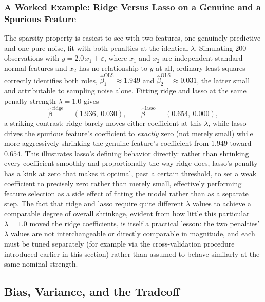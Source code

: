 \documentclass[../ai_in_finance]{subfiles}
\begin{document}
\subsubsection*{A Worked Example: Ridge Versus Lasso on a Genuine and a Spurious Feature}

The sparsity property is easiest to see with two features, one genuinely predictive and one pure noise, fit with both penalties at the identical $\lambda$. Simulating $200$ observations with $y = 2.0\,x_1 + \varepsilon$, where $x_1$ and $x_2$ are independent standard-normal features and $x_2$ has no relationship to $y$ at all, ordinary least squares correctly identifies both roles, $\hat\beta_1^{\text{OLS}} \approx 1.949$ and $\hat\beta_2^{\text{OLS}} \approx 0.031$, the latter small and attributable to sampling noise alone. Fitting ridge and lasso at the same penalty strength $\lambda=1.0$ gives
\begin{equation*}
\hat\beta^{\text{ridge}} = (1.936,\ 0.030), \qquad \hat\beta^{\text{lasso}} = (0.654,\ 0.000),
\end{equation*}
a striking contrast: ridge barely moves either coefficient at this $\lambda$, while lasso drives the spurious feature's coefficient to \emph{exactly} zero (not merely small) while more aggressively shrinking the genuine feature's coefficient from $1.949$ toward $0.654$. This illustrates lasso's defining behavior directly: rather than shrinking every coefficient smoothly and proportionally the way ridge does, lasso's penalty has a kink at zero that makes it optimal, past a certain threshold, to set a weak coefficient to precisely zero rather than merely small, effectively performing feature selection as a side effect of fitting the model rather than as a separate step. The fact that ridge and lasso require quite different $\lambda$ values to achieve a comparable degree of overall shrinkage, evident from how little this particular $\lambda=1.0$ moved the ridge coefficients, is itself a practical lesson: the two penalties' $\lambda$ values are not interchangeable or directly comparable in magnitude, and each must be tuned separately (for example via the cross-validation procedure introduced earlier in this section) rather than assumed to behave similarly at the same nominal strength.

\subsection{Bias, Variance, and the Tradeoff}
\label{sec:bias-variance}
\end{document}

